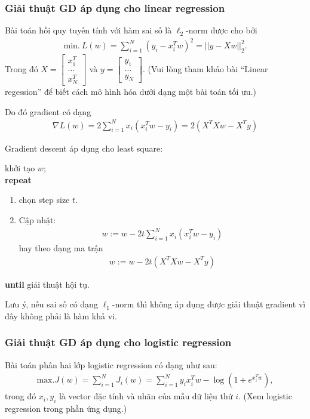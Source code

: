 \documentclass{book}
\begin{document}
\subsubsection{Giải thuật GD áp dụng cho linear regression}
Bài toán hồi quy tuyến tính với hàm sai số là $\ell_2$-norm được cho bởi
\begin{align}
\mathrm{min.} ~ L(w) = \sum_{i=1}^N (y_i - x_i^Tw)^2 = ||y - Xw||_2^2.
\end{align}
Trong đó $X = \begin{bmatrix} x_1^T \\ ... \\ x_{N}^T\end{bmatrix}$ và $y = \begin{bmatrix} y_1 \\ ... \\ y_{N}\end{bmatrix}$.
(Vui lòng tham khảo bài ``Linear regession'' để biết cách mô hình hóa dưới dạng một bài toán tối ưu.)

Do đó gradient có dạng
\begin{align*}
\nabla L(w) =  2 \sum_{i=1}^N x_i (x_i^T w - y_i) = 2(X^T X w - X^T y)
\end{align*}

Gradient descent áp dụng cho least square:
\begin{algorithm}[H]
khởi tạo $w$;\\
\textbf{repeat} 
\begin{enumerate}
\item chọn step size $t$.
\item Cập nhật: 
\begin{align*}
w := w - 2t \sum_{i=1}^N x_i (x_i^T w - y_i)
\end{align*}
hay theo dạng ma trận
\begin{align*}
w := w - 2t (X^T X w - X^T y)
\end{align*}
\end{enumerate}
\textbf{until} giải thuật hội tụ. 
\caption{Giải thuật gradient descent áp dụng cho least square.}
\label{alg:gd_leastsquare}
\end{algorithm}

Lưu ý, nếu sai số có dạng $\ell_1$-norm thì không áp dụng được giải thuật gradient vì đây không phải là hàm khả vi.

\subsubsection{Giải thuật GD áp dụng cho logistic regression}
Bài toán phân hai lớp logistic regression có dạng như sau:
\begin{align*}
\mathrm{max.} J(w) = \sum_{i=1}^N J_i(w) = \sum_{i=1}^N y_i x_i^T w - \log (1 + e^{ x_i^T w}),
\end{align*}
trong đó $x_i, y_i$ là vector đặc tính và nhãn của mẫu dữ liệu thứ $i$. 
(Xem logistic regression trong phần ứng dụng.)
\end{document}
